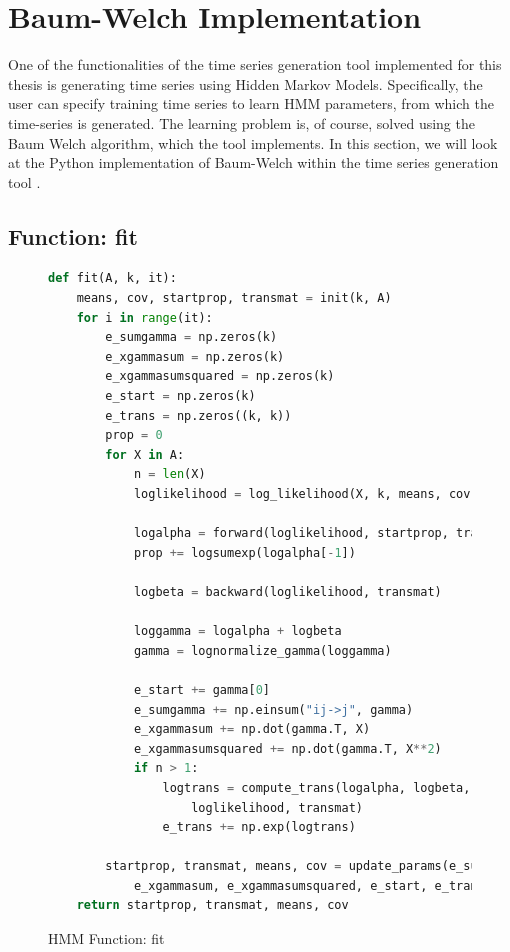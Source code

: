 
\chapter{Baum-Welch Implementation}\label{chapter:hmm-impl}

One of the functionalities of the time series generation tool implemented for this thesis is generating time series using Hidden Markov Models. Specifically, the user can specify training time series to learn HMM parameters, from which the time-series is generated. The learning problem is, of course, solved using the Baum Welch algorithm, which the tool implements. In this section, we will look at the Python implementation of Baum-Welch within the time series generation tool \parencite{tsgenerator}.

\section{Function: fit}

\begin{figure}
\begin{singlespace}
\begin{lstlisting}[language=Python]
def fit(A, k, it):
    means, cov, startprop, transmat = init(k, A)
    for i in range(it):
        e_sumgamma = np.zeros(k)
        e_xgammasum = np.zeros(k)
        e_xgammasumsquared = np.zeros(k)
        e_start = np.zeros(k)
        e_trans = np.zeros((k, k))
        prop = 0
        for X in A:
            n = len(X)
            loglikelihood = log_likelihood(X, k, means, cov)

            logalpha = forward(loglikelihood, startprop, transmat)
            prop += logsumexp(logalpha[-1])

            logbeta = backward(loglikelihood, transmat)

            loggamma = logalpha + logbeta
            gamma = lognormalize_gamma(loggamma)

            e_start += gamma[0]
            e_sumgamma += np.einsum("ij->j", gamma)
            e_xgammasum += np.dot(gamma.T, X)
            e_xgammasumsquared += np.dot(gamma.T, X**2)
            if n > 1:
                logtrans = compute_trans(logalpha, logbeta, \
                    loglikelihood, transmat)
                e_trans += np.exp(logtrans)

        startprop, transmat, means, cov = update_params(e_sumgamma, \
            e_xgammasum, e_xgammasumsquared, e_start, e_trans)
    return startprop, transmat, means, cov
\end{lstlisting}
\end{singlespace}
   
\caption{HMM Function: fit}    
\label{fig:hmm-fit-listing}
\end{figure}

